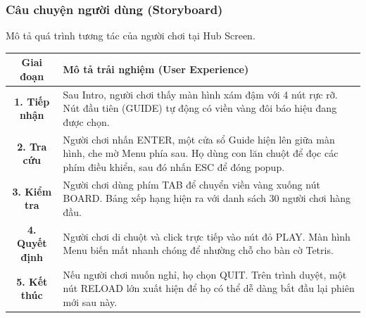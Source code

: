 \documentclass[12pt,a4paper]{article}
\begin{document}
\subsubsection{Câu chuyện người dùng (Storyboard)}
Mô tả quá trình tương tác của người chơi tại Hub Screen.

\vspace{5pt}
\begin{tabularx}{\linewidth}{|c|X|}
    \hline
    \textbf{Giai đoạn} & \textbf{Mô tả trải nghiệm (User Experience)} \\
    \hline
    \textbf{1. Tiếp nhận} & Sau Intro, người chơi thấy màn hình xám đậm với 4 nút rực rỡ. Nút đầu tiên (GUIDE) tự động có viền vàng đôi báo hiệu đang được chọn. \\
    \hline
    \textbf{2. Tra cứu} & Người chơi nhấn ENTER, một cửa sổ Guide hiện lên giữa màn hình, che mờ Menu phía sau. Họ dùng con lăn chuột để đọc các phím điều khiển, sau đó nhấn ESC để đóng popup. \\
    \hline
    \textbf{3. Kiểm tra} & Người chơi dùng phím TAB để chuyển viền vàng xuống nút BOARD. Bảng xếp hạng hiện ra với danh sách 30 người chơi hàng đầu. \\
    \hline
    \textbf{4. Quyết định} & Người chơi di chuột và click trực tiếp vào nút đỏ PLAY. Màn hình Menu biến mất nhanh chóng để nhường chỗ cho bàn cờ Tetris. \\
    \hline
    \textbf{5. Kết thúc} & Nếu người chơi muốn nghỉ, họ chọn QUIT. Trên trình duyệt, một nút RELOAD lớn xuất hiện để họ có thể dễ dàng bắt đầu lại phiên mới sau này. \\
    \hline
\end{tabularx}
\end{document}
